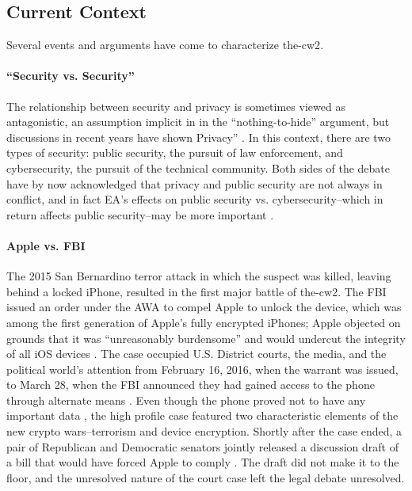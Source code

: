 \subsection{Current Context}
\label{sec-history-current}

Several events and arguments have come to characterize \ac{the-cw2}.

\paragraph*{``Security vs. Security''} The relationship between security and privacy is sometimes viewed as
antagonistic, an assumption implicit in in the ``nothing-to-hide'' argument, but discussions in recent years have shown
Privacy'' \cite{stalla_bourdillon_privacy_2014}. In this context, there are two types of security: public security, the
pursuit of law enforcement, and cybersecurity, the pursuit of the technical community. Both sides of the debate have by
now acknowledged that privacy and public security are not always in conflict, and in fact \ac{EA}'s effects on public
security vs. cybersecurity--which in return affects public security--may be more important \cite{schneier_2019}.

\paragraph*{Apple vs. FBI} The 2015 San Bernardino terror attack in which the suspect was killed, leaving behind a
locked iPhone, resulted in the first major battle of \ac{the-cw2}. The \ac{FBI} issued an order under the \acrlong{AWA}
to compel Apple to unlock the device, which was among the first generation of Apple's fully encrypted iPhones; Apple
objected on grounds that it was ``unreasonably burdensome'' and would undercut the integrity of all iOS devices
\cite{schulze_clipper_2017}. The case occupied U.S. District courts, the media, and the political world's attention from
February 16, 2016, when the warrant was issued, to March 28, when the \ac{FBI} announced they had gained access to the
phone through alternate means \cite{novet_2016}. Even though the phone proved not to have any important data
\cite{schulze_clipper_2017}, the high profile case featured two characteristic elements of the new crypto
wars--terrorism and device encryption. Shortly after the case ended, a pair of Republican and Democratic senators
jointly released a discussion draft of a bill that would have forced Apple to comply \cite{burr_2016}. The draft did not
make it to the floor, and the unresolved nature of the court case left the legal debate unresolved.

